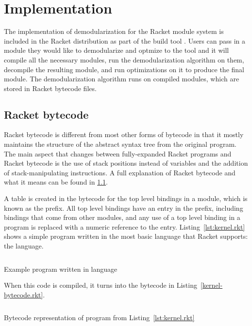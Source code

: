 \chapter{Implementation}
\label{chap:implementation}

The implementation of demodularization for the Racket module system is included in the Racket distribution as part of the build tool . 
Users can pass in a module they would like to demodularize and optmize to the tool and it will compile all the necessary modules, run the demodularization algorithm on them, decompile the resulting module, and run optimizations on it to produce the final module.
The demodularization algorithm runs on compiled modules, which are stored in Racket bytecode files.

\section{Racket bytecode}
Racket bytecode is different from most other forms of bytecode in that it mostly maintains the structure of the abstract syntax tree from the original program.
The main aspect that changes between fully-expanded Racket programs and Racket bytecode is the use of stack positions instead of variables and the addition of stack-manipulating instructions.
A full explanation of Racket bytecode and what it means can be found in \ref{}.

A table is created in the bytecode for the top level bindings in a module, which is known as the prefix.
All top level bindings have an entry in the prefix, including bindings that come from other modules, and any use of a top level binding in a program is replaced with a numeric reference to the entry.
Listing~\ref{lst:kernel.rkt} shows a simple program written in the most basic language that Racket supports: the  language.
\begin{listing}
  \inputminted{racket}{listings/kernel.rkt}
  \caption{Example program written in  language}
  \label{lst:kernel.rkt}
\end{listing}
When this code is compiled, it turns into the bytecode in Listing~\ref{kernel-bytecode.rkt}. 
\begin{listing}
  \inputminted{racket}{listings/kernel-bytecode.rkt}
  \caption{Bytecode representation of program from Listing~\ref{lst:kernel.rkt}}
  \label{lst:kernel-bytecode.rkt}
\end{listing}

